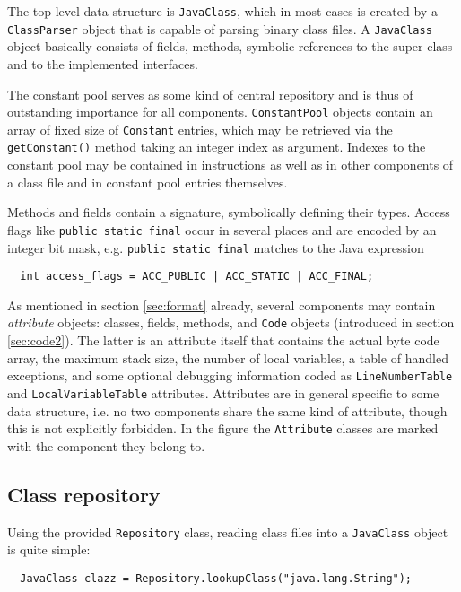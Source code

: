 \documentclass[12pt,twoside]{article}
\newcommand\cp{{constant pool }}
\begin{document}
The  top-level data  structure  is \texttt{JavaClass},  which in  most
cases is created by  a \texttt{Class\-Par\-ser} object that is capable
of parsing  binary class files. A  \texttt{JavaClass} object basically
consists of  fields, methods, symbolic  references to the  super class
and to the implemented interfaces.

The  \cp serves  as some  kind of  central repository  and is  thus of
outstanding  importance  for  all  components.   \texttt{ConstantPool}
objects contain  an array of fixed size  of \texttt{Constant} entries,
which may be retrieved via the \texttt{getConstant()} method taking an
integer  index as argument.  Indexes to  the \cp  may be  contained in
instructions as well as in other components of a class file and in \cp
entries themselves.

Methods and  fields contain  a signature, symbolically  defining their
types.   Access  flags  like  \texttt{public static  final}  occur  in
several  places  and  are  encoded   by  an  integer  bit  mask,  e.g.
\texttt{public static final} matches to the Java expression

\begin{verbatim}
  int access_flags = ACC_PUBLIC | ACC_STATIC | ACC_FINAL;
\end{verbatim}

As mentioned in section \ref{sec:format} already, several components
may contain \emph{attribute} objects: classes, fields, methods, and
\texttt{Code} objects (introduced in section \ref{sec:code2}).  The
latter is an attribute itself that contains the actual byte code
array, the maximum stack size, the number of local variables, a table
of handled exceptions, and some optional debugging information coded
as \texttt{LineNumberTable} and \texttt{LocalVariableTable}
attributes. Attributes are in general specific to some data structure,
i.e. no two components share the same kind of attribute, though this
is not explicitly forbidden. In the figure the \texttt{Attribute}
classes are marked with the component they belong to.

\subsection{Class repository}

Using the provided \texttt{Repository} class, reading class files into
a \texttt{JavaClass} object is quite simple:

\begin{verbatim}
  JavaClass clazz = Repository.lookupClass("java.lang.String");
\end{verbatim}
\end{document}

